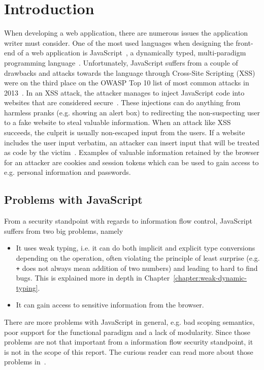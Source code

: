 \chapter{Introduction}
\label{chapter:intro}
When developing a web application, there are numerous issues the application writer must consider. One of the most used languages when designing the front-end of a web application is JavaScript~\cite{javascript_popularity}, a dynamically typed, multi-paradigm programming language~\cite{javascript_info}. Unfortunately, JavaScript suffers from a couple of drawbacks and attacks towards the language through Cross-Site Scripting (XSS) were on the third place on the OWASP Top 10 list of most common attacks in 2013~\cite{owasp_xss_rank}. In an XSS attack, the attacker manages to inject JavaScript code into websites that are considered secure~\cite{owasp_xss, excess_xss}. These injections can do anything from harmless pranks (e.g. showing an alert box) to redirecting the non-suspecting user to a fake website to steal valuable information. When an attack like XSS succeeds, the culprit is usually non-escaped input from the users. If a website includes the user input verbatim, an attacker can insert input that will be treated as code by the victim~\cite{excess_xss}. Examples of valuable information retained by the browser for an attacker are cookies and session tokens which can be used to gain access to e.g. personal information and passwords.
\section{Problems with JavaScript}
From a security standpoint with regards to information flow control, JavaScript suffers from two big problems, namely
\begin{itemize}
  \item It uses weak typing, i.e. it can do both implicit and explicit type conversions depending on the operation, often violating the principle of least surprise (e.g. {\tt +} does not always mean addition of two numbers) and leading to hard to find bugs. This is explained more in depth in Chapter~\ref{chapter:weak-dynamic-typing}.
  \item It can gain access to sensitive information from the browser.
\end{itemize}
There are more problems with JavaScript in general, e.g. bad scoping semantics, poor support for the functional paradigm and a lack of modularity. Since those problems are not that important from a information flow security standpoint, it is not in the scope of this report. The curious reader can read more about those problems in~\cite{haste-lang}.

